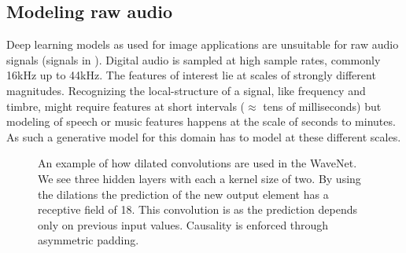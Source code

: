 \subsection{Modeling raw audio}
Deep learning models as used for image applications are unsuitable for raw audio signals (signals in ). Digital audio is sampled at high sample rates, commonly 16kHz up to 44kHz. The features of interest lie at scales of strongly different magnitudes. Recognizing the local-structure of a signal, like frequency and timbre, might require features at short intervals (\(\approx\) tens of milliseconds) but modeling of speech or music features happens at the scale of seconds to minutes. As such a generative model for this domain has to model at these different scales.

\begin{figure}[]
    
    \caption{An example of how dilated convolutions are used in the WaveNet. We see three hidden layers with each a kernel size of two. By using the dilations the prediction of the new output element has a receptive field of 18. This convolution is  as the prediction depends only on previous input values. Causality is enforced through asymmetric padding.}
    \label{fig:wavenet}
\end{figure}

